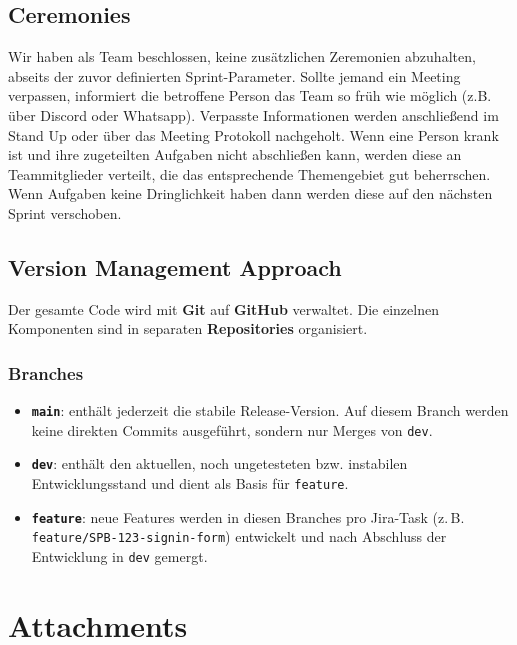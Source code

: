 \documentclass{article}
\newcommand{\branch}[1]{\texttt{#1}}
\begin{document}
\subsection{Ceremonies}
Wir haben als Team beschlossen, keine zusätzlichen Zeremonien abzuhalten, abseits der zuvor definierten Sprint-Parameter. Sollte jemand ein Meeting verpassen, informiert die betroffene Person das Team so früh wie möglich (z.B. über Discord oder Whatsapp). Verpasste Informationen werden anschließend im Stand Up oder über das Meeting Protokoll nachgeholt. Wenn eine Person krank ist und ihre zugeteilten Aufgaben nicht abschließen kann, werden diese an Teammitglieder verteilt, die das entsprechende Themengebiet gut beherrschen. Wenn Aufgaben keine Dringlichkeit haben dann werden diese auf den nächsten Sprint verschoben.





\subsection{Version Management Approach}

Der gesamte Code wird mit \textbf{Git} auf \textbf{GitHub} verwaltet.
Die einzelnen Komponenten sind in separaten \textbf{Repositories} organisiert.

\subsubsection{Branches}
\begin{itemize}
  \item \textbf{\branch{main}}: enthält jederzeit die stabile Release-Version. Auf diesem Branch werden keine direkten Commits ausgeführt, sondern nur Merges von \branch{dev}.
  \item \textbf{\branch{dev}}: enthält den aktuellen, noch ungetesteten bzw. instabilen Entwicklungsstand und dient als Basis für \branch{feature}.
  \item \textbf{\branch{feature}}: neue Features werden in diesen Branches pro Jira-Task (z.\,B. \texttt{feature/SPB-123-signin-form}) entwickelt und nach Abschluss der Entwicklung in \branch{dev} gemergt.
\end{itemize}











\section{Attachments}
\end{document}
